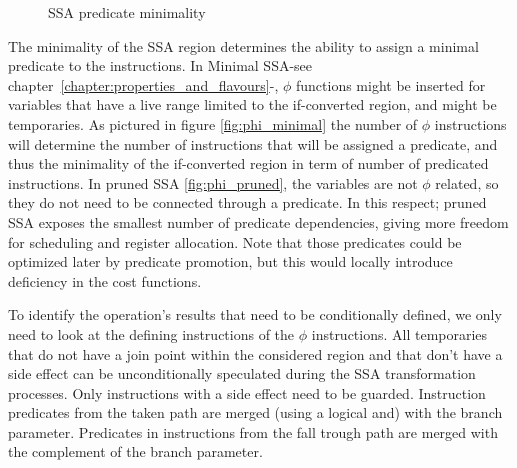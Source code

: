 \begin{figure}[h]
\centering
\caption{SSA predicate minimality}
\label{fig:minimality}
\end{figure}

The minimality of the SSA region determines the ability to assign a minimal predicate to the instructions. In Minimal SSA-see chapter~\ref{chapter:properties_and_flavours}-, $\phi$ functions might be inserted for variables that have a live range limited to the if-converted region, and might be temporaries. As pictured in figure \ref{fig:phi_minimal} the number of $\phi$ instructions will determine the number of instructions that will be assigned a predicate, and thus the minimality of the if-converted region in term of number of predicated instructions. In pruned SSA \ref{fig:phi_pruned}, the variables are not $\phi$ related, so they do not need to be connected through a predicate. In this respect; pruned SSA exposes the smallest number of predicate dependencies, giving more freedom for scheduling and register allocation. Note that those predicates could be optimized later by predicate promotion, but this would locally introduce deficiency in the cost functions.

To identify the operation's results that need to be conditionally defined, we only need to look at the defining instructions of the $\phi$ instructions. All temporaries that do not have a join point within the considered region and that don't have a side effect can be unconditionally speculated during the SSA transformation processes. Only instructions with a side effect need to be guarded. 
Instruction predicates from the taken path are merged (using a logical and) with the branch parameter. Predicates in instructions from the fall trough path are merged with the complement of the branch parameter.

